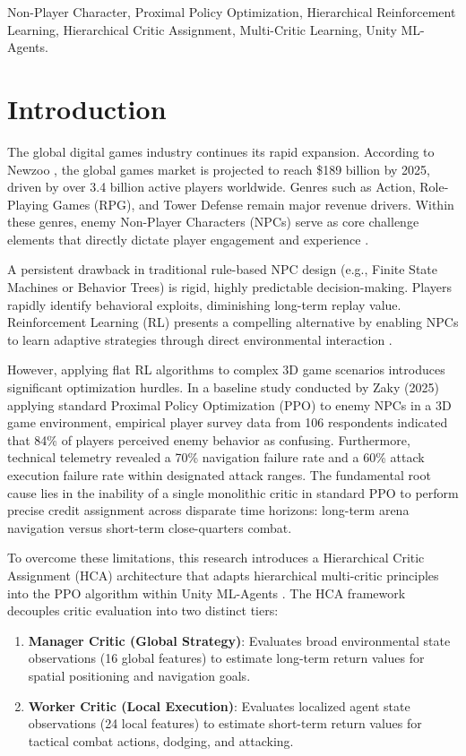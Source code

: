 \documentclass[conference]{IEEEtran}
\begin{document}
\begin{IEEEkeywords}
Non-Player Character, Proximal Policy Optimization, Hierarchical Reinforcement Learning, Hierarchical Critic Assignment, Multi-Critic Learning, Unity ML-Agents.
\end{IEEEkeywords}

\section{Introduction}
The global digital games industry continues its rapid expansion. According to Newzoo \cite{newzoo2025}, the global games market is projected to reach \$189 billion by 2025, driven by over 3.4 billion active players worldwide. Genres such as Action, Role-Playing Games (RPG), and Tower Defense remain major revenue drivers. Within these genres, enemy Non-Player Characters (NPCs) serve as core challenge elements that directly dictate player engagement and experience \cite{yannakakis2018artificial}.

A persistent drawback in traditional rule-based NPC design (e.g., Finite State Machines or Behavior Trees) is rigid, highly predictable decision-making. Players rapidly identify behavioral exploits, diminishing long-term replay value. Reinforcement Learning (RL) presents a compelling alternative by enabling NPCs to learn adaptive strategies through direct environmental interaction \cite{sutton2018reinforcement}.

However, applying flat RL algorithms to complex 3D game scenarios introduces significant optimization hurdles. In a baseline study conducted by Zaky (2025) applying standard Proximal Policy Optimization (PPO) to enemy NPCs in a 3D game environment, empirical player survey data from 106 respondents indicated that 84\% of players perceived enemy behavior as confusing. Furthermore, technical telemetry revealed a 70\% navigation failure rate and a 60\% attack execution failure rate within designated attack ranges. The fundamental root cause lies in the inability of a single monolithic critic in standard PPO to perform precise credit assignment across disparate time horizons: long-term arena navigation versus short-term close-quarters combat.

To overcome these limitations, this research introduces a Hierarchical Critic Assignment (HCA) architecture that adapts hierarchical multi-critic principles \cite{cao2023reinforcement} into the PPO algorithm within Unity ML-Agents \cite{juliani2018unity}. The HCA framework decouples critic evaluation into two distinct tiers:
\begin{enumerate}
    \item \textbf{Manager Critic (Global Strategy)}: Evaluates broad environmental state observations (16 global features) to estimate long-term return values for spatial positioning and navigation goals.
    \item \textbf{Worker Critic (Local Execution)}: Evaluates localized agent state observations (24 local features) to estimate short-term return values for tactical combat actions, dodging, and attacking.
\end{enumerate}
\end{document}
